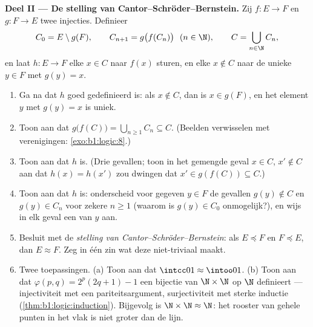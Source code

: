 \begin{problem}
\medskip
\noindent\textbf{Deel II --- De stelling van
Cantor--Schröder--Bernstein.} Zij $f \colon E \to F$ en $g \colon F \to
E$ twee injecties. Definieer
\[
C_0 = E \setminus g(F), \qquad C_{n+1} = g\bigl(f(C_n)\bigr)
\ \ (n \in \N), \qquad C = \bigcup_{n \in \N} C_n,
\]
en laat $h \colon E \to F$ elke $x \in C$ naar $f(x)$ sturen, en elke $x
\notin C$ naar de unieke $y \in F$ met $g(y) = x$.
\begin{enumerate}[resume]
  \item Ga na dat $h$ goed gedefinieerd is: als $x \notin C$, dan is $x
        \in g(F)$, en het element $y$ met $g(y) = x$ is uniek.
  \item Toon aan dat $g\bigl(f(C)\bigr) = \bigcup_{n \geq 1} C_n
        \subseteq C$. (Beelden verwisselen met verenigingen:
        \cref{exo:b1:logic:8}.)
  \item Toon aan dat $h$  is. (Drie gevallen; toon in het
        gemengde geval $x \in C$, $x' \notin C$ aan dat $h(x) = h(x')$
        zou dwingen dat $x' \in g(f(C)) \subseteq C$.)
  \item Toon aan dat $h$  is: onderscheid voor gegeven $y \in
        F$ de gevallen $g(y) \notin C$ en $g(y) \in C_n$ voor zekere $n
        \geq 1$ (waarom is $g(y) \in C_0$ onmogelijk?), en wijs in elk
        geval een  van $y$ aan.
  \item Besluit met de \emph{stelling van
        Cantor--Schröder--Bernstein}: als $E \preceq F$ en $F \preceq
        E$, dan $E \approx F$. Zeg in één zin wat deze 
        niet-triviaal maakt.
  \item Twee toepassingen. (a) Toon aan dat $\intcc01 \approx \intoo01$.
        (b) Toon aan dat $\varphi(p, q) = 2^p(2q + 1) - 1$ een bijectie
        van $\N \times \N$ op $\N$ definieert --- injectiviteit met een
        pariteitsargument, surjectiviteit met sterke inductie
        (\cref{thm:b1:logic:induction}). Bijgevolg is $\N \times \N
        \approx \N$: het rooster van gehele punten in het vlak is niet
        groter dan de lijn.
\end{enumerate}


\end{problem}
